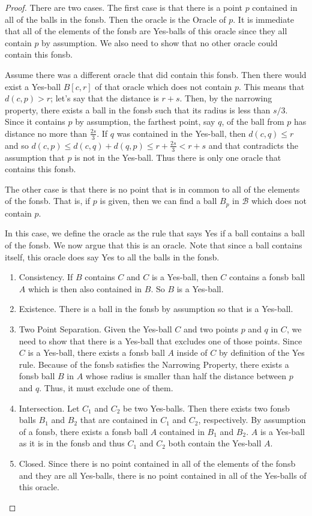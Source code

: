 \documentclass[12pt]{article}
\begin{document}
\begin{proof}
    There are two cases. The first case is that there is a point $p$ contained in all of the balls in the fonsb. Then the oracle is the Oracle of $p$. It is immediate that all of the elements of the fonsb are Yes-balls of this oracle since they all contain $p$ by assumption. We 
    also need to show that no other oracle could contain this fonsb.

    Assume there was a different oracle that did contain this fonsb. Then there would exist a Yes-ball $B[c,r]$ of that oracle which does not contain $p$. This means that $d(c,p) > r$; let's say that the distance is $r +s$. Then, by the narrowing property, there exists a ball in the fonsb such that its radius is less than $s/3$. Since it contains $p$ by assumption, the farthest point, say $q$, of the ball from $p$ has distance no more than $\frac{2s}{3}$. If $q$ was contained in the Yes-ball, then $d(c,q)  \leq r$ and so $d(c, p) \leq d(c, q) + d(q,p) \leq r + \frac{2s}{3} < r + s$ and that contradicts the assumption that $p$ is not in the Yes-ball. Thus there is only one oracle that contains this fonsb. 

    The other case is that there is no point that is in common to all of the elements of the fonsb. That is, if $p$ is given, then we can find a ball $B_p$ in $\mathcal{B}$ which does not contain $p$. 

    In this case, we define the oracle as the rule that says Yes if a ball contains a ball of the fonsb. We now argue that this is an oracle. Note that since a ball contains itself, this oracle does say Yes to all the balls in the fonsb.

    \begin{enumerate}
        \item Consistency. If $B$ contains $C$ and $C$ is a Yes-ball, then $C$ contains a fonsb ball $A$ which is then also contained in $B$. So $B$ is a Yes-ball.
        \item Existence. There is a ball in the fonsb by assumption so that is a Yes-ball. 
        \item Two Point Separation. Given the Yes-ball $C$ and two points $p$ and $q$ in $C$, we need to show that there is a Yes-ball that excludes one of those points. Since $C$ is a Yes-ball, there exists a fonsb ball $A$ inside of $C$ by definition of the Yes rule. Because of the fonsb satisfies the Narrowing Property, there exists a fonsb ball $B$ in $A$ whose radius is smaller than half the distance between $p$ and $q$. Thus, it must exclude one of them. 
        \item Intersection. Let $C_1$ and $C_2$ be two Yes-balls. Then there exists two fonsb balls $B_1$ and $B_2$ that are contained in $C_1$ and $C_2$, respectively. By assumption of a fonsb, there exists a fonsb ball $A$ contained in $B_1$ and $B_2$. $A$ is a Yes-ball as it is in the fonsb and thus $C_1$ and $C_2$ both contain the Yes-ball $A$.
        \item Closed. Since there is no point contained in all of the elements of the fonsb and they are all Yes-balls, there is no point contained in all of the Yes-balls of this oracle. 
    \end{enumerate}


\end{proof}
\end{document}
